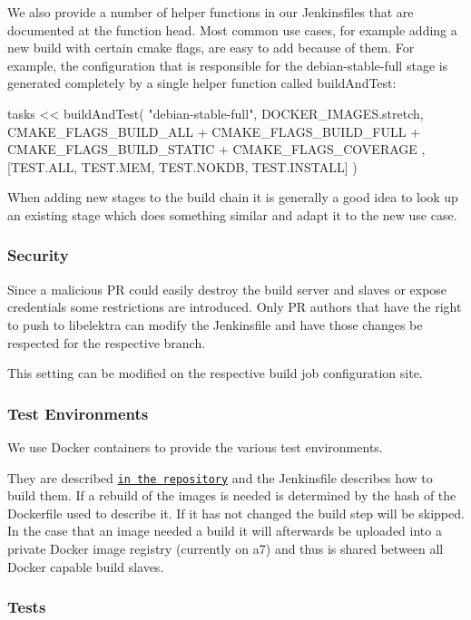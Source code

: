 We also provide a number of helper functions in our Jenkinsfiles that are documented at the function head. Most common use cases, for example adding a new build with certain cmake flags, are easy to add because of them. For example, the configuration that is responsible for the {\ttfamily debian-\/stable-\/full} stage is generated completely by a single helper function called {\ttfamily build\+And\+Test}\+:


\begin{DoxyCode}
tasks << buildAndTest(
  "debian-stable-full",
  DOCKER\_IMAGES.stretch,
  CMAKE\_FLAGS\_BUILD\_ALL +
    CMAKE\_FLAGS\_BUILD\_FULL +
    CMAKE\_FLAGS\_BUILD\_STATIC +
    CMAKE\_FLAGS\_COVERAGE
  ,
  [TEST.ALL, TEST.MEM, TEST.NOKDB, TEST.INSTALL]
)
\end{DoxyCode}


When adding new stages to the build chain it is generally a good idea to look up an existing stage which does something similar and adapt it to the new use case.

\subsubsection*{Security}

Since a malicious PR could easily destroy the build server and slaves or expose credentials some restrictions are introduced. Only PR authors that have the right to push to libelektra can modify the Jenkinsfile and have those changes be respected for the respective branch.

This setting can be modified on the respective build job configuration site.

\subsubsection*{Test Environments}

We use Docker containers to provide the various test environments.

They are described \href{https://master.libelektra.org/scripts/docker}{\tt in the repository} and the Jenkinsfile describes how to build them. If a rebuild of the images is needed is determined by the hash of the Dockerfile used to describe it. If it has not changed the build step will be skipped. In the case that an image needed a build it will afterwards be uploaded into a private Docker image registry (currently on a7) and thus is shared between all Docker capable build slaves.

\subsubsection*{Tests}


